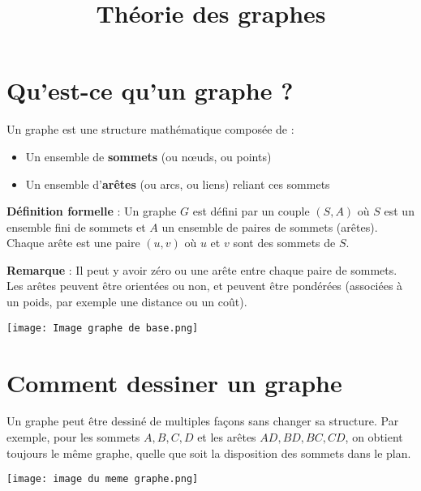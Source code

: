 \documentclass[10pt,a4paper]{article}
\title{Théorie des graphes}
\date{}
\begin{document}
\maketitle

\section*{Qu'est-ce qu'un graphe ?}

Un graphe est une structure mathématique composée de :
\begin{itemize}
    \item Un ensemble de \textbf{sommets} (ou nœuds, ou points)
    \item Un ensemble d'\textbf{arêtes} (ou arcs, ou liens) reliant ces sommets
\end{itemize}

\textbf{Définition formelle} : Un graphe \( G \) est défini par un couple \( (S, A) \) où \( S \) est un ensemble fini de sommets et \( A \) un ensemble de paires de sommets (arêtes). Chaque arête est une paire \( (u, v) \) où \( u \) et \( v \) sont des sommets de \( S \).

\textbf{Remarque} : Il peut y avoir zéro ou une arête entre chaque paire de sommets. Les arêtes peuvent être orientées ou non, et peuvent être pondérées (associées à un poids, par exemple une distance ou un coût).

\texttt{[image: Image graphe de base.png]}

\section*{Comment dessiner un graphe}

Un graphe peut être dessiné de multiples façons sans changer sa structure. Par exemple, pour les sommets \( A, B, C, D \) et les arêtes \( AD, BD, BC, CD \), on obtient toujours le même graphe, quelle que soit la disposition des sommets dans le plan.

\texttt{[image: image du meme graphe.png]}
\end{document}
